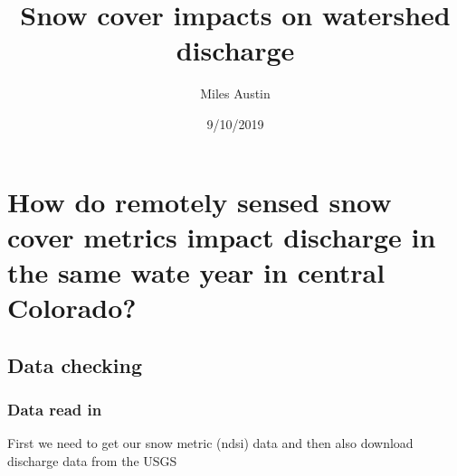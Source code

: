 \documentclass[]{article}
\title{Snow cover impacts on watershed discharge}
\author{Miles Austin}
\date{9/10/2019}
\begin{document}
\maketitle

{
\setcounter{tocdepth}{2}
\tableofcontents
}
\hypertarget{how-do-remotely-sensed-snow-cover-metrics-impact-discharge-in-the-same-wate-year-in-central-colorado}{%
\section{How do remotely sensed snow cover metrics impact discharge in
the same wate year in central
Colorado?}\label{how-do-remotely-sensed-snow-cover-metrics-impact-discharge-in-the-same-wate-year-in-central-colorado}}

\hypertarget{data-checking}{%
\subsection{Data checking}\label{data-checking}}

\hypertarget{data-read-in}{%
\subsubsection{Data read in}\label{data-read-in}}

First we need to get our snow metric (ndsi) data and then also download
discharge data from the USGS
\end{document}
